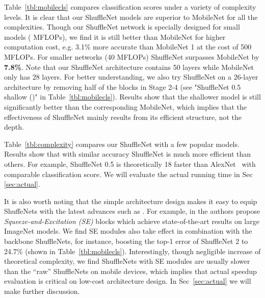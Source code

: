 \documentclass[10pt,twocolumn,letterpaper]{article}
\begin{document}
Table~\ref{tbl:mobilecls} compares classification scores under a variety of complexity levels. It is clear that our ShuffleNet models are superior to MobileNet for all the complexities. Though our ShuffleNet network is specially designed for small models ( MFLOPs), we find it is still better than MobileNet for higher computation cost, e.g. 3.1\% more accurate than MobileNet 1 at the cost of 500 MFLOPs. For smaller networks (40 MFLOPs) ShuffleNet surpasses MobileNet by \textbf{7.8\%}. Note that our ShuffleNet architecture contains 50 layers while MobileNet only has 28 layers. For better understanding, we also try ShuffleNet on a 26-layer architecture by removing half of the blocks in Stage 2-4 (see "ShuffleNet 0.5 shallow ()" in Table~\ref{tbl:mobilecls}). Results show that the shallower model is still significantly better than the corresponding MobileNet, which implies that the effectiveness of ShuffleNet mainly results from its efficient structure, not the depth.



Table~\ref{tbl:complexity} compares our ShuffleNet with a few popular models. Results show that with similar accuracy ShuffleNet is much more efficient than others. For example, ShuffleNet 0.5 is theoretically 18 faster than AlexNet~\cite{krizhevsky2012imagenet} with comparable classification score. We will evaluate the actual running time in Sec \ref{sec:actual}.

It is also worth noting that the simple architecture design makes it easy to equip ShuffeNets with the latest advances such as \cite{hu2017squeeze, ramachandran2017swish}. For example, in \cite{hu2017squeeze} the authors propose \emph{Squeeze-and-Excitation (SE)} blocks which achieve state-of-the-art results on large ImageNet models. We find SE modules also take effect in combination with the backbone ShuffleNets, for instance, boosting the top-1 error of ShuffleNet 2 to 24.7\% (shown in Table~\ref{tbl:mobilecls}). Interestingly, though negligible increase of theoretical complexity, we find ShuffleNets with SE modules are usually  slower than the ``raw'' ShuffleNets on mobile devices, which implies that actual speedup evaluation is critical on low-cost architecture design. In Sec~\ref{sec:actual} we will make further discussion.
\end{document}
